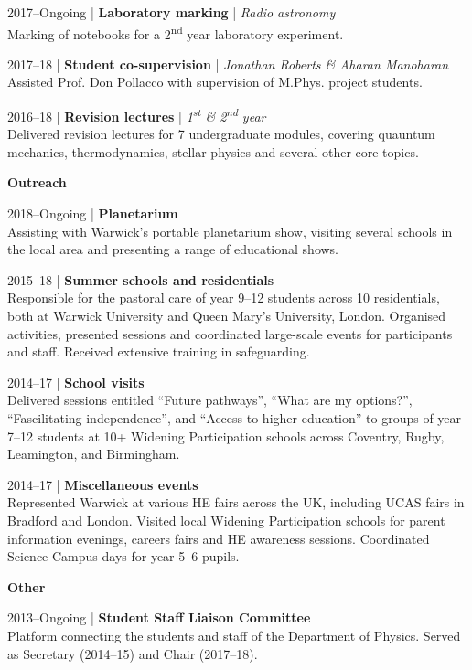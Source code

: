 \documentclass[10pt,a4paper]{altacv}
\begin{document}
\medskip

\small 2017--Ongoing | \textbf{Laboratory marking} | \textit{Radio astronomy} \\
Marking of notebooks for a 2\textsuperscript{nd} year laboratory experiment.

\divider

\small 2017--18 | \textbf{Student co-supervision} | \textit{Jonathan Roberts \& Aharan Manoharan} \\
Assisted Prof. Don Pollacco with supervision of M.Phys. project students.

\divider

\small 2016--18 | \textbf{Revision lectures} | \textit{1\textsuperscript{st} \& 2\textsuperscript{nd} year} \\
Delivered revision lectures for 7 undergraduate modules, covering quauntum mechanics, thermodynamics, stellar physics and several other core topics.

\medskip

\normalsize \textbf{Outreach}

\medskip

\small 2018--Ongoing | \textbf{Planetarium} \\
Assisting with Warwick's portable planetarium show, visiting several schools in the local area and presenting a range of educational shows.

\divider

\small 2015--18 | \textbf{Summer schools and residentials} \\
Responsible for the pastoral care of year 9--12 students across 10 residentials, both at Warwick University and Queen Mary's University, London.
Organised activities, presented sessions and coordinated large-scale events for participants and staff.
Received extensive training in safeguarding.

\divider

\small 2014--17 | \textbf{School visits} \\
Delivered sessions entitled ``Future pathways'', ``What are my options?'', ``Fascilitating independence'', and ``Access to higher education'' to groups of year 7--12 students at 10+ Widening Participation schools across Coventry, Rugby, Leamington, and Birmingham.

\divider

\small 2014--17 | \textbf{Miscellaneous events} \\
Represented Warwick at various HE fairs across the UK, including UCAS fairs in Bradford and London.
Visited local Widening Participation schools for parent information evenings, careers fairs and HE awareness sessions.
Coordinated Science Campus days for year 5--6 pupils.

\medskip

\normalsize \textbf{Other}

\medskip

\small 2013--Ongoing | \textbf{Student Staff Liaison Committee} \\
Platform connecting the students and staff of the Department of Physics.
Served as Secretary (2014--15) and Chair (2017--18).
\end{document}

